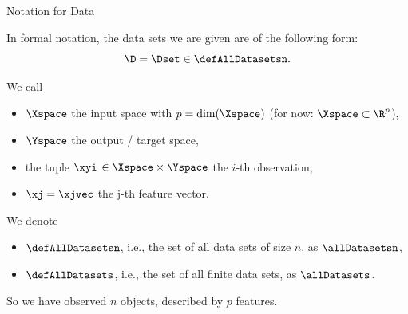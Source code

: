 \begin{vbframe}{Notation for Data}

In formal notation, the data sets we are given are of the following form:
\[
\D = \Dset \in \defAllDatasetsn.
\]

We call

\begin{itemize}

  \item $\Xspace$  the input space with $p = \text{dim}(\Xspace)$ (for now:
  $\Xspace \subset \R^p$),

  \item $\Yspace$ the output / target space,

  \item the tuple \(\xyi\) $\in \Xspace\times \Yspace$ the \(i\)-th observation,

  \item $\xj = \xjvec$ the j-th feature vector.

\end{itemize}

We denote

\begin{itemize}

  \item  $\defAllDatasetsn$, i.e., the set of all data sets of size $n$, as $\allDatasetsn$,
  \item $\defAllDatasets$, i.e., the set of all finite data sets, as $\allDatasets$.
\end{itemize}

\lz

So we have observed $n$ objects, described by $p$ features.

\end{vbframe}


